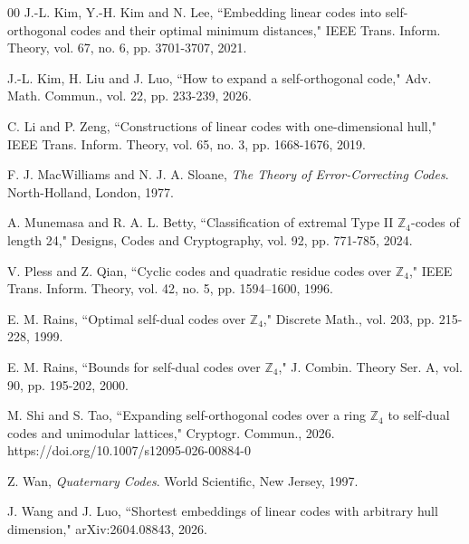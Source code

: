 \documentclass{article}
\theoremstyle{definition}
\theoremstyle{remark}
\begin{document}
\begin{thebibliography}{00}
 J.-L. Kim, Y.-H. Kim and N. Lee, ``Embedding linear codes into self-orthogonal codes and their optimal minimum distances," IEEE Trans. Inform. Theory, vol. 67, no. 6, pp. 3701-3707, 2021.

 J.-L. Kim, H. Liu and J. Luo, ``How to expand a self-orthogonal code," Adv. Math. Commun., vol. 22, pp. 233-239, 2026. 

 C. Li and P. Zeng, ``Constructions of linear codes with one-dimensional hull," IEEE Trans. Inform. Theory, vol. 65, no. 3, pp. 1668-1676, 2019.

 F. J. MacWilliams and N. J. A. Sloane, {\it The Theory of Error-Correcting Codes}. North-Holland, London, 1977.

 A. Munemasa and R. A. L. Betty, ``Classification of extremal Type II $\mathbb Z_4$-codes of length 24," Designs, Codes and Cryptography, vol. 92, pp. 771-785, 2024.

 V. Pless and Z. Qian, ``Cyclic codes and quadratic residue codes over $\mathbb Z_4$," IEEE Trans. Inform. Theory, vol. 42, no. 5, pp. 1594--1600, 1996.

 E. M. Rains, ``Optimal self-dual codes over $\mathbb{Z}_4$," Discrete Math., vol. 203, pp. 215-228, 1999.

 E. M. Rains, ``Bounds for self-dual codes over $\mathbb{Z}_4$," J. Combin. Theory Ser. A, vol. 90, pp. 195-202, 2000.

 M. Shi and S. Tao, ``Expanding self-orthogonal codes over a ring $\mathbb{Z}_4$ to self-dual codes and unimodular lattices," Cryptogr. Commun., 2026. https://doi.org/10.1007/s12095-026-00884-0

 Z. Wan, {\it Quaternary Codes}. World Scientific, New Jersey, 1997.

 J. Wang and J. Luo, ``Shortest embeddings of linear codes with arbitrary hull dimension," arXiv:2604.08843, 2026.

\end{thebibliography}
\end{document}
